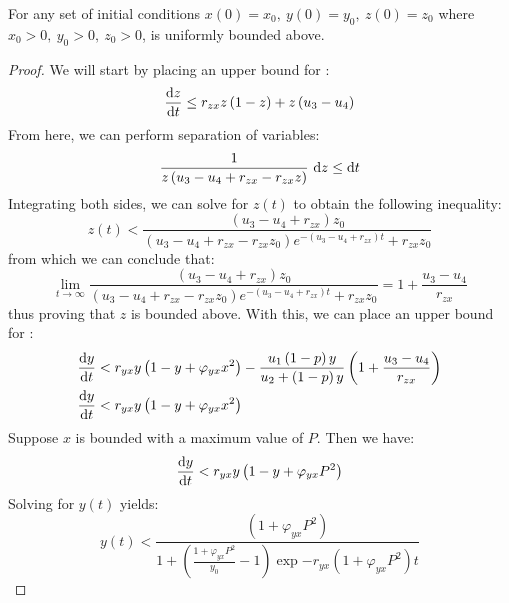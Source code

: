 \begin{theorem}\label{thm:bounded}
    For any set of initial conditions $x(0) = x_0,\ y(0) = y_0,\ z(0) = z_0$ where $x_0 > 0,\ y_0 > 0,\ z_0 > 0$,  is uniformly bounded above.
\end{theorem}
\begin{proof}
    We will start by placing an upper bound for :
    \begin{equation*}
        \diff[]{z}{t} \leq r_{zx}z\left(1-z\right)+z\left(u_3-u_4\right)
    \end{equation*}
    From here, we can perform separation of variables:
    \begin{equation*}
        \frac{1}{z\left(u_3-u_4+r_{zx}-r_{zx}z\right)}\ \opdiff{z} \leq \opdiff{t}
    \end{equation*}
    Integrating both sides, we can solve for $z(t)$ to obtain the following inequality:
    \begin{equation*}
        z(t) < \frac{\left(u_3-u_4+r_{zx}\right)z_0}{\left(u_3-u_4+r_{zx}-r_{zx}z_0\right)e^{-\left(u_3-u_4+r_{zx}\right)t}+r_{zx}z_0}
    \end{equation*}
    from which we can conclude that:
    \begin{equation*}
        \lim_{t\to\infty} \frac{\left(u_3-u_4+r_{zx}\right)z_0}{\left(u_3-u_4+r_{zx}-r_{zx}z_0\right)e^{-\left(u_3-u_4+r_{zx}\right)t}+r_{zx}z_0} = 1+\frac{u_3-u_4}{r_{zx}}
    \end{equation*}
    thus proving that $z$ is bounded above.
    With this, we can place an upper bound for :
    \begin{align*}
        \diff[]{y}{t}&<r_{yx}y\left(1-y+\varphi_{yx}x^2\right)-\frac{u_1\left(1-p\right)y}{u_2+\left(1-p\right)y}\left(1+\frac{u_3-u_4}{r_{zx}}\right)\\
        \diff[]{y}{t}&<r_{yx}y\left(1-y+\varphi_{yx}x^2\right)
    \end{align*}
    Suppose $x$ is bounded with a maximum value of $P$.
    Then we have:
    \begin{equation*}
        \diff[]{y}{t}<r_{yx}y\left(1-y+\varphi_{yx}P^2\right)
    \end{equation*}
    Solving for $y(t)$ yields:
    \begin{equation*}
        y(t)<\frac{\left(1+\varphi_{yx}P^2\right)}{1+\left(\frac{1+\varphi_{yx}P^2}{y_0}-1\right)\exp{-r_{yx}\left(1+\varphi_{yx}P^2\right)t}}
    \end{equation*}

\end{proof}
